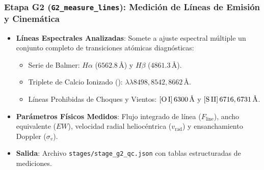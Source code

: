\documentclass[11pt,a4paper]{article}
\begin{document}
\subsubsection{Etapa G2 (\texttt{G2\_measure\_lines}): Medición de Líneas de Emisión y Cinemática}
\begin{itemize}[leftmargin=1.0cm]
    \item \textbf{Líneas Espectrales Analizadas}: Somete a ajuste espectral múltiple un conjunto completo de transiciones atómicas diagnósticas:
    \begin{itemize}
        \item Serie de Balmer: $H\alpha$ ($6562.8\,\text{\AA}$) y $H\beta$ ($4861.3\,\text{\AA}$).
        \item Triplete de Calcio Ionizado (): $\lambda\lambda 8498, 8542, 8662\,\text{\AA}$.
        \item Líneas Prohibidas de Choques y Vientos: $[\text{O\,I}]\,6300\,\text{\AA}$ y $[\text{S\,II}]\,6716, 6731\,\text{\AA}$.
    \end{itemize}
    \item \textbf{Parámetros Físicos Medidos}: Flujo integrado de línea ($F_\text{line}$), ancho equivalente ($EW$), velocidad radial heliocéntrica ($v_\text{rad}$) y ensanchamiento Doppler ($\sigma_v$).
    \item \textbf{Salida}: Archivo \texttt{stages/stage\_g2\_qc.json} con tablas estructuradas de mediciones.
\end{itemize}
\end{document}
